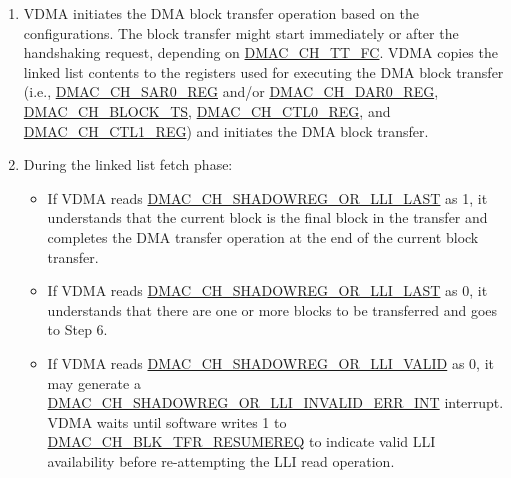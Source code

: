 \documentclass[main\_\_EN.tex]{subfiles}
\begin{document}
\begin{enumerate}
\begin{tiplisting}
You can swap the sequence of Step 4 and Step 5. However, if Step 5 is performed before Step 4, or if the linked list item for the next block transfer is not
available in system memory during the multi-block transfer (i.e., \hyperref[fielddesc:DMACCHNSHADOWREGORLLIVALID]{DMAC\_CH\_SHADOWREG\_OR\_LLI\_VALID} of the fetched LLI is 0), VDMA may generate a\\ \hyperref[int:DMACCHNSHADOWREGORLLIINVALIDERRINT]{DMAC\_CH\_SHADOWREG\_OR\_LLI\_INVALID\_ERR\_INT} interrupt.
\end{tiplisting}

    \item VDMA initiates the DMA block transfer operation based on the configurations. The block transfer might start immediately or after the handshaking request, depending on \hyperref[fielddesc:DMACCHNTTFC]{DMAC\_CH\_TT\_FC}. VDMA copies the linked list contents to the registers used for executing the DMA block transfer (i.e., \hyperref[regdesc:DMACCHNSAR0REG]{DMAC\_CH\_SAR0\_REG} and/or \hyperref[regdesc:DMACCHNDAR0REG]{DMAC\_CH\_DAR0\_REG}, \hyperref[fielddesc:DMACCHNBLOCKTS]{DMAC\_CH\_BLOCK\_TS}, \hyperref[regdesc:DMACCHNCTL0REG]{DMAC\_CH\_CTL0\_REG}, and \hyperref[regdesc:DMACCHNCTL1REG]{DMAC\_CH\_CTL1\_REG}) and initiates the DMA block transfer.

    \item During the linked list fetch phase:
        \begin{itemize}
        \item If VDMA reads \hyperref[fielddesc:DMACCHNSHADOWREGORLLILAST]{DMAC\_CH\_SHADOWREG\_OR\_LLI\_LAST} as 1, it understands that the current block is the final block in the transfer and completes the DMA transfer operation at the end of the current block transfer.

        \item If VDMA reads \hyperref[fielddesc:DMACCHNSHADOWREGORLLILAST]{DMAC\_CH\_SHADOWREG\_OR\_LLI\_LAST} as 0, it understands that there are one or more blocks to be transferred and goes to Step 6.

        \item If VDMA reads \hyperref[fielddesc:DMACCHNSHADOWREGORLLIVALID]{DMAC\_CH\_SHADOWREG\_OR\_LLI\_VALID} as 0, it may generate a \hyperref[int:DMACCHNSHADOWREGORLLIINVALIDERRINT]{DMAC\_CH\_SHADOWREG\_OR\_LLI\_INVALID\_ERR\_INT} interrupt. VDMA waits until software writes 1 to \hyperref[fielddesc:DMACCHNBLKTFRRESUMEREQ]{DMAC\_CH\_BLK\_TFR\_RESUMEREQ} to indicate valid LLI availability before re-attempting the LLI read operation.
    \end{itemize}
\end{enumerate}
\end{document}
